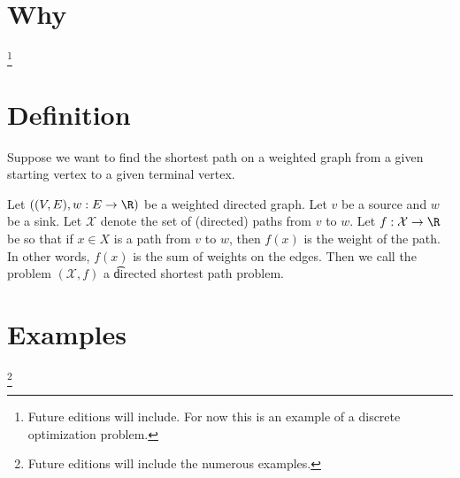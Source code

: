 
\section*{Why}
\footnote{Future editions will include. For now this is an example of a discrete optimization problem.}
\section*{Definition}

Suppose we want to find the shortest path on a weighted graph from a given starting vertex to a given terminal vertex.

Let $((V, E), w: E \to \R )$ be a weighted directed graph.
Let $v$ be a source and $w$ be a sink.
Let $\mathcal{X} $ denote the set of (directed) paths from $v$ to $w$.
Let $f: \mathcal{X}  \to \R $ be so that if $x \in X$ is a path from $v$ to $w$, then $f(x)$ is the weight of the path.
In other words, $f(x)$ is the sum of weights on the edges.
Then we call the problem $(\mathcal{X} , f)$ a \t{directed shortest path problem}.

\section*{Examples}
\footnote{Future editions will include the numerous examples.}
\blankpage